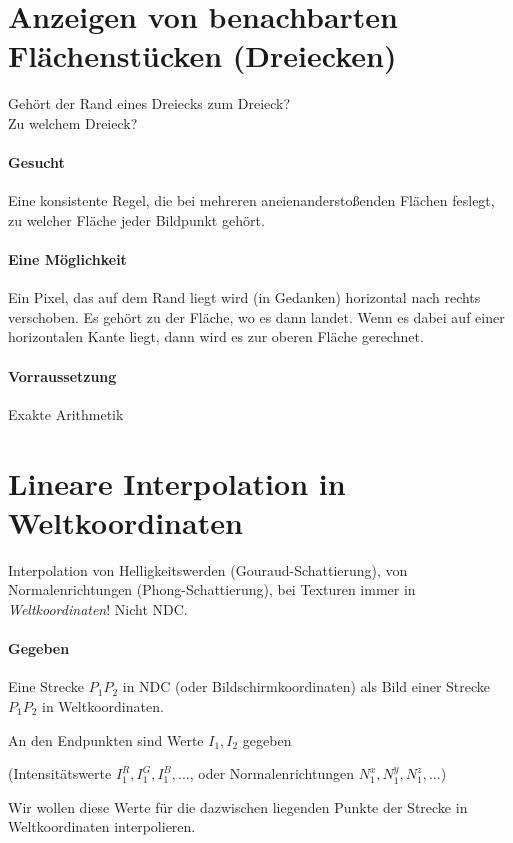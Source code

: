 \section{Anzeigen von benachbarten Flächenstücken (Dreiecken)}
\begin{center}
\end{center}
Gehört der Rand eines Dreiecks zum Dreieck?\\
Zu welchem Dreieck?
\paragraph*{Gesucht} Eine konsistente Regel, die bei mehreren aneienanderstoßenden Flächen feslegt, zu welcher Fläche
jeder Bildpunkt gehört.
\paragraph*{Eine Möglichkeit} Ein Pixel, das auf dem Rand liegt wird (in Gedanken) horizontal nach rechts verschoben.
	Es gehört zu der Fläche, wo es dann landet. Wenn es dabei auf einer horizontalen Kante liegt, dann wird es zur
	oberen Fläche gerechnet.
\begin{center}
\end{center}
\paragraph*{Vorraussetzung} Exakte Arithmetik

\section{Lineare Interpolation in Weltkoordinaten}
Interpolation von Helligkeitswerden (Gouraud-Schattierung), von Normalenrichtungen (Phong-Schattierung), bei Texturen
immer in \emph{Weltkoordinaten}! Nicht NDC.
\paragraph{Gegeben} Eine Strecke $P_1P_2$ in NDC (oder Bildschirmkoordinaten) als Bild einer Strecke $P_1P_2$
	in Weltkoordinaten.

	An den Endpunkten sind Werte $I_1, I_2$ gegeben

	(Intensitätswerte $I_1^R, I_1^G, I_1^B,...$, oder
	Normalenrichtungen $N_1^x, N_1^y, N_1^z,...$)

	Wir wollen diese Werte für die dazwischen liegenden Punkte der Strecke in Weltkoordinaten interpolieren.

